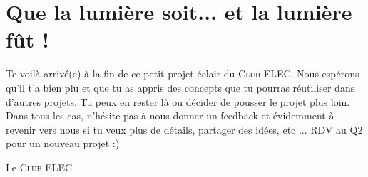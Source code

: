 \section{Que la lumière soit... et la lumière fût !}

Te voilà arrivé(e) à la fin de ce petit projet-éclair du \textsc{Club ELEC}. Nous espérons qu'il t'a bien plu et que tu as appris des concepts que tu pourras réutiliser dans d'autres projets. Tu peux en rester là ou décider de pousser le projet plus loin. Dans tous les cas, n'hésite pas à nous donner un feedback et évidemment à revenir vers nous si tu veux plus de détails, partager des idées, etc ... RDV au Q2 pour un nouveau projet :)\\

\begin{flushright}
Le \textsc{Club ELEC}
\end{flushright}
